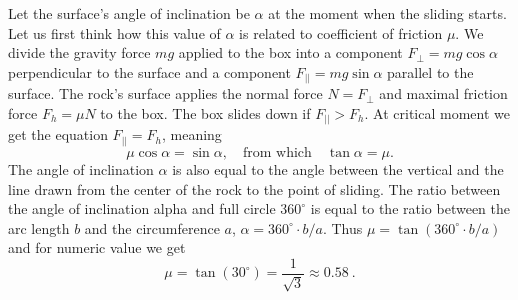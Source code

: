 \solueng
Let the surface’s angle of inclination be $\alpha$ at the moment when the sliding starts. Let us first think how this value of $\alpha$ is related to coefficient of friction $\mu$. We divide the gravity force $mg$ applied to the box into a component $F_{\bot}=mg\cos\alpha$ perpendicular to the surface and a component $F_{||}=mg\sin\alpha$ parallel to the surface. The rock’s surface applies the normal force $N=F_\bot$ and maximal friction force $F_h=\mu N$ to the box. The box slides down if $F_{||}>F_h$. At critical moment we get the equation $F_{||}=F_h$, meaning
\[ \mu \cos \alpha = \sin\alpha, \quad \text{from which} \quad \tan\alpha = \mu.\]
The angle of inclination $\alpha$ is also equal to the angle between the vertical and the line drawn from the center of the rock to the point of sliding. The ratio between the angle of inclination alpha and full circle $360^\circ$ is equal to the ratio between the arc length $b$ and the circumference $a$, $\alpha = 360^\circ \!\cdot\! b/a$. Thus $\mu = \tan (360^\circ \! \cdot\! b/a)$ and for numeric value we get 
\[\mu = \tan (30^\circ) = \frac{1}{\sqrt{3}} \approx \SI{0,58}{}.\]
\probend
